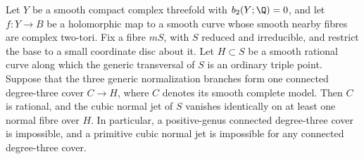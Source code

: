 
\begin{proposition}\label{cdp:st:C.2.D4.1}
Let $Y$ be a smooth compact complex threefold with
$b_2(Y;\Q)=0$, and let $f:Y\to B$ be a holomorphic map to a
smooth curve whose smooth nearby fibres are complex two-tori.
Fix a fibre $mS$, with $S$ reduced and irreducible, and restrict
the base to a small coordinate disc about it. Let
$H\subset S$ be a smooth rational curve along which the generic
transversal of $S$ is an ordinary triple point. Suppose that the
three generic normalization branches form one connected degree-three
cover $C\to H$, where $C$ denotes its smooth complete model.
Then $C$ is rational, and the cubic normal jet of $S$ vanishes
identically on at least one normal fibre over $H$.
In particular, a positive-genus connected degree-three cover is
impossible, and a primitive cubic normal jet is impossible for
any connected degree-three cover.
\end{proposition}
